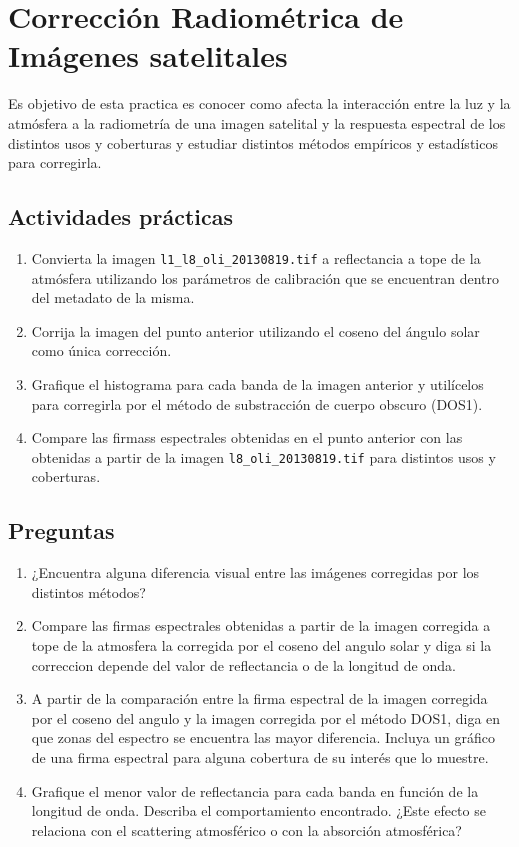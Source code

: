 \documentclass[hidelinks,12pt]{article}
\begin{document}
\newpage
\section{Corrección Radiométrica de Imágenes satelitales}
Es objetivo de esta practica es conocer como afecta la interacción entre la luz
y la atmósfera a la radiometr\'ia de una imagen satelital y la respuesta
espectral de los distintos usos y coberturas  y estudiar distintos métodos empíricos 
y estadísticos para corregirla.
\subsection{Actividades pr\'acticas}
\begin{enumerate}
    \item Convierta la imagen  \texttt{l1\_l8\_oli\_20130819.tif} a reflectancia a 
        tope de la atmósfera utilizando los parámetros de calibración que se 
        encuentran dentro del metadato de la misma.
    \item Corrija la imagen del punto anterior utilizando el coseno del ángulo solar 
        como única corrección.
    \item Grafique el histograma para cada banda de la imagen anterior y utilícelos 
        para corregirla por el método de substracción de cuerpo obscuro (DOS1).
    \item Compare las firmass espectrales obtenidas en el punto anterior con las
        obtenidas a partir de la imagen \texttt{l8\_oli\_20130819.tif} para
        distintos usos y coberturas.
\end{enumerate}

\subsection{Preguntas}
\begin{enumerate}
    \item ¿Encuentra alguna diferencia visual entre las imágenes corregidas por los
        distintos métodos?
    \item Compare las firmas espectrales obtenidas a partir de la imagen
        corregida a tope de la atmosfera  la corregida por el coseno del angulo
        solar y diga si la correccion depende del valor de reflectancia o de la
        longitud de onda.
    \item A partir de la comparación entre la firma espectral de la imagen
        corregida por el coseno del angulo y la imagen corregida por el método DOS1, 
        diga en que zonas del espectro se encuentra las mayor diferencia. Incluya 
        un gráfico de una firma espectral para alguna cobertura de su interés que 
        lo muestre.
    \item Grafique el menor valor de reflectancia para cada banda en función de la
        longitud de onda. Describa el comportamiento encontrado. ¿Este efecto se
        relaciona con el scattering atmosférico o con la absorción atmosférica?
\end{enumerate}
\newpage
\end{document}
